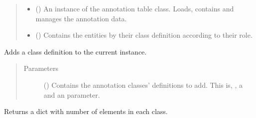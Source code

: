 \documentclass[letterpaper,10pt,english]{sphinxmanual}
\begin{document}
\begin{fulllineitems}
\begin{quote}
\begin{description}
\begin{itemize}
\item {} 
 () \textendash{} An instance of the annotation table class. Loads, contains and
manages the annotation data.

\item {} 
 () \textendash{} Contains the entities by their class definition according to
their role.

\end{itemize}

\end{description}\end{quote}

\begin{fulllineitems}
\label{\detokenize{reference:pypath.annot.CustomAnnotation.add_class_definitions}}
Adds a class definition to the current instance.
\begin{quote}\begin{description}
\item[{Parameters}] \leavevmode
{} () \textendash{} Contains the annotation classes’ definitions to add. This
is, , a  and an  parameter.

\end{description}\end{quote}

\end{fulllineitems}


\begin{fulllineitems}
\label{\detokenize{reference:pypath.annot.CustomAnnotation.counts}}
Returns a dict with number of elements in each class.

\end{fulllineitems}


\end{fulllineitems}
\end{document}
